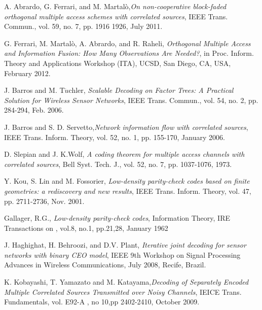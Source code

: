 \documentclass[journal]{IEEEtran}
\begin{document}
\begin{thebibliography}{1}

 A. Abrardo, G. Ferrari, and M. Martal\`o,\emph{On non-cooperative 
block-faded orthogonal multiple access schemes with correlated sources}, IEEE Trans. Commun., vol. 59, no. 7, pp. 1916 1926, July 2011.

  G. Ferrari, M. Martal\`o, A. Abrardo,  and R. Raheli,
\emph{Orthogonal Multiple Access and Information Fusion: How Many Observations Are Needed?}, 
in Proc. Inform. Theory and Applications Workshop (ITA), UCSD, San Diego, CA, USA, February 2012.

 J. Barros and  M. T$\ddot{u}$chler,\emph{ Scalable Decoding on Factor Trees: A Practical Solution for Wireless Sensor Networks},
IEEE Trans. Commun., vol. 54, no. 2, pp. 284-294, Feb. 2006.


 J. Barros and S. D. Servetto,\emph{Network information flow with correlated sources}, 
IEEE Trans. Inform. Theory, vol. 52, no. 1, pp. 155-170, January 2006.

D. Slepian and J. K.Wolf, \emph{A coding theorem for multiple access channels
with correlated sources}, Bell Syst. Tech. J., vol. 52, no. 7, pp.
1037-1076, 1973.

 Y. Kou, S. Lin and M. Fossorier, \emph{Low-density parity-check codes
based on finite geometries: a rediscovery and new results}, IEEE
Trans. Inform. Theory, vol. 47, pp. 2711-2736, Nov. 2001.


 Gallager, R.G., \emph{Low-density parity-check codes}, 
Information Theory, IRE Transactions on , vol.8, no.1, pp.21,28, January 1962


 J. Haghighat, H. Behroozi, and D.V. Plant, 
\emph{Iterative joint decoding for sensor networks with binary CEO model}, 
IEEE 9th Workshop on Signal Processing Advances in Wireless Communications, July 2008,
Recife, Brazil.

 K. Kobayashi, T. Yamazato and M. Katayama,\emph{Decoding of Separately Encoded Multiple Correlated Sources Transmitted over Noisy Channels},
  IEICE Trans. Fundamentals,  vol. E92-A ,  no 10,pp 2402-2410, October 2009.


\end{thebibliography}
\end{document}
